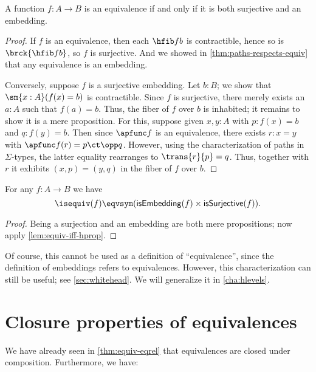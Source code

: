 \begin{thm}\label{thm:mono-surj-equiv}
  A function $f:A\to B$ is an equivalence if and only if it is both surjective and an embedding.
\end{thm}
\begin{proof}
  If $f$ is an equivalence, then each $\hfib f b$ is contractible, hence so is $\brck{\hfib f b}$, so $f$ is surjective.
  And we showed in \cref{thm:paths-respects-equiv} that any equivalence is an embedding.

  Conversely, suppose $f$ is a surjective embedding.
  Let $b:B$; we show that $\sm{x:A}(f(x)=b)$ is contractible.
  Since $f$ is surjective, there merely exists an $a:A$ such that $f(a)=b$.
  Thus, the fiber of $f$ over $b$ is inhabited; it remains to show it is a mere proposition.
  For this, suppose given $x,y:A$ with $p:f(x)=b$ and $q:f(y)=b$.
  Then since $\apfunc f$ is an equivalence, there exists $r:x=y$ with $\apfunc f (r) = p \ct \opp q$.
  However, using the characterization of paths in $\Sigma$-types, the latter equality rearranges to $\trans{r}{p} = q$.
  Thus, together with $r$ it exhibits $(x,p) = (y,q)$ in the fiber of $f$ over $b$.
\end{proof}

\begin{cor}
  For any $f:A\to B$ we have
  \[ \isequiv(f) \eqvsym (\mathsf{isEmbedding}(f) \times \mathsf{isSurjective}(f)).\]
\end{cor}
\begin{proof}
  Being a surjection and an embedding are both mere propositions; now apply \cref{lem:equiv-iff-hprop}.
\end{proof}

Of course, this cannot be used as a definition of ``equivalence'', since the definition of embeddings refers to equivalences.
However, this characterization can still be useful; see \cref{sec:whitehead}.
We will generalize it in \cref{cha:hlevels}.


\section{Closure properties of equivalences}
\label{sec:equiv-closures}
\label{sec:fiberwise-equivalences}
%


We have already seen in \cref{thm:equiv-eqrel} that equivalences are closed under composition.
Furthermore, we have:

